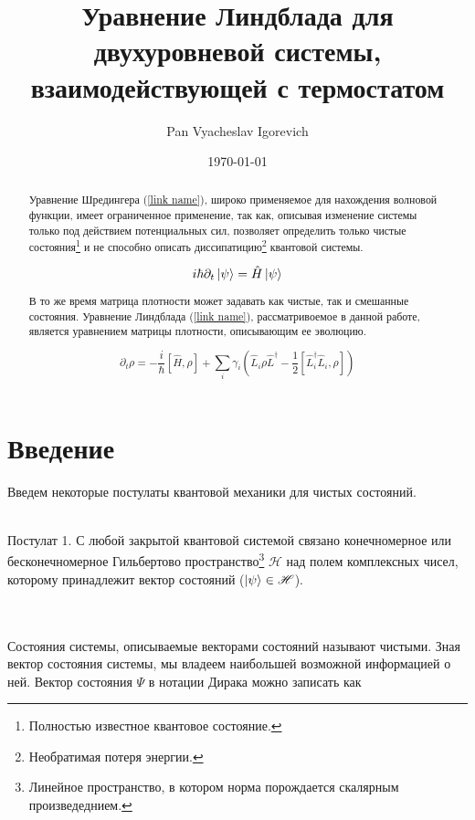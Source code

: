 \documentclass[a4paper, 10pt]{article}
\title{Уравнение Линдблада для двухуровневой системы, взаимодействующей с термостатом}
\author{Pan Vyacheslav Igorevich}
\date{\today}
\begin{document}
\maketitle
    \begin{abstract}
        Уравнение Шредингера (\ref{link name}), широко применяемое для нахождения волновой функции, имеет ограниченное применение, 
        так как, описывая изменение системы только под действием потенциальных сил, позволяет определить только чистые 
        состояния\footnote{Полностью известное квантовое состояние.} и не способно описать диссипатицию\footnote{Необратимая потеря энергии.}
        квантовой системы.

        \begin{equation} \label{link name}
            i\hbar\partial_{t} \ket{\psi} = \hat{H}\ket{\psi}
        \end{equation}

        В то же время матрица плотности может задавать как чистые, так и смешанные состояния. Уравнение Линдблада
        (\ref{link name}), рассматривоемое в данной работе, является уравнением матрицы плотности, описывающим ее эволюцию.

        \begin{equation}\label{link name}
            \partial_t \rho = -\frac{i}{\hbar} [\hat{H},\rho] + \sum_i \gamma_i ( \hat{L}_{i} \rho \hat{L}^{\dagger} - \frac{1}{2} [\hat{L}_{i}^{\dagger} \hat{L}_i , \rho]) 
        \end{equation}

    \end{abstract}

    \section{Введение}
        Введем некоторые постулаты квантовой механики для чистых состояний.
        \\ \\
        \begin{itshape}
            \centering Постулат 1. С любой закрытой квантовой системой связано конечномерное или бесконечномерное 
            Гильбертово пространство\footnote{Линейное пространство, в котором норма порождается скалярным произведеднием.} $\mathscr{H}$ 
            над полем комплексных чисел, 
            которому принадлежит вектор состояний ($\ket{\psi} \in \mathscr{H}$).
        \end{itshape}
        \\ \\
        Состояния системы, описываемые векторами состояний называют чистыми. Зная вектор состояния системы, мы владеем наибольшей возможной 
        информацией о ней.
        Вектор состояния $\Psi$ в нотации Дирака можно записать как 
     
\end{document}
